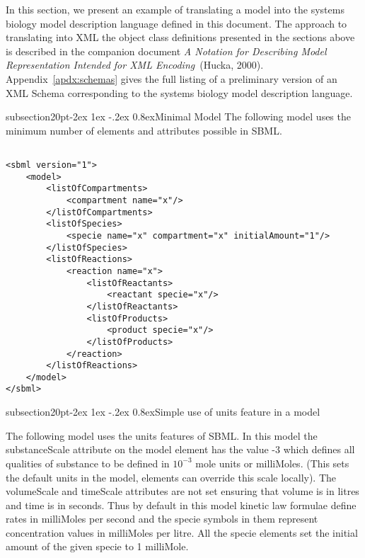 \documentclass[10pt]{article}
\makeatletter
\renewcommand{\subsection}{\@startsection%
  {subsection}{2}{0pt}{-2ex \@plus 1ex \@minus -.2ex}%
  {0.8ex}{\slshape\large\bfseries}}
\newcommand{\tightspacing}{\renewcommand{\baselinestretch}{0.85}}
\newcommand{\regularspacing}{\renewcommand{\baselinestretch}{1.0}}
\newcommand{\class}[1]{\textsf{#1}}
\newcommand{\attrib}[1]{\textsf{#1}}
\makeatother
\begin{document}
In this section, we present an example of translating a model
into the systems biology model description language defined in
this document.  The approach to translating into XML the object
class definitions presented in the sections above is described in
the companion document \emph{A
  Notation for Describing Model Representation Intended for XML
  Encoding}~(Hucka, 2000).  Appendix~\ref{apdx:schemas} gives the full
listing of a preliminary version of an XML Schema corresponding
to the systems biology model description language.

\subsection{Minimal Model}
The following model uses the minimum number of elements and attributes possible in SBML.

\begin{small}
\tightspacing
\begin{verbatim}

<sbml version="1">
    <model>
        <listOfCompartments>
            <compartment name="x"/>
        </listOfCompartments>
        <listOfSpecies>
            <specie name="x" compartment="x" initialAmount="1"/>
        </listOfSpecies>
        <listOfReactions>
            <reaction name="x">
                <listOfReactants>
                    <reactant specie="x"/>
                </listOfReactants>
                <listOfProducts>
                    <product specie="x"/>
                </listOfProducts>
            </reaction>
        </listOfReactions>
    </model>
</sbml>

\end{verbatim}
\regularspacing
\end{small}

\subsection{Simple use of units feature in a model}
\label{subsection:unitseg}

The following model uses the units features of SBML.  In this
model the \attrib{substanceScale} attribute on the \class{model}
element has the value -3 which defines all qualities of substance
to be defined in $10^{-3}$ mole units or milliMoles.  (This sets
the default units in the model, elements can override this scale
locally).  The \attrib{volumeScale} and \attrib{timeScale}
attributes are not set ensuring that volume is in litres and time
is in seconds.  Thus by default in this model kinetic law
formulae define rates in milliMoles per second and the specie
symbols in them represent concentration values in milliMoles per
litre.  All the \class{specie} elements set the initial amount of
the given specie to 1 milliMole.
\end{document}
